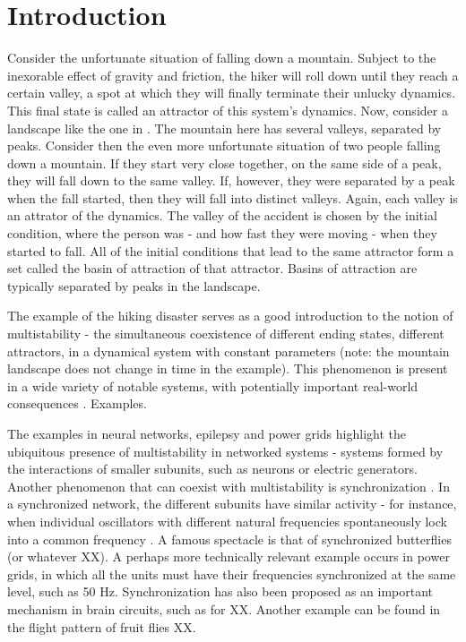 \chapter{Introduction}
Consider the unfortunate situation of falling down a mountain. Subject to the inexorable effect of gravity and friction, the hiker will roll down until they reach a certain valley, a spot at which they will finally terminate their unlucky dynamics. This final state is called an attractor of this system's dynamics. Now, consider a landscape like the one in . The mountain here has several valleys, separated by peaks. Consider then the even more unfortunate situation of two people falling down a mountain. If they start very close together, on the same side of a peak, they will fall down to the same valley. If, however, they were separated by a peak when the fall started, then they will fall into distinct valleys. Again, each valley is an attrator of the dynamics. The valley of the accident is chosen by the initial condition, where the person was - and how fast they were moving - when they started to fall. All of the initial conditions that lead to the same attractor form a set called the basin of attraction of that attractor. Basins of attraction are typically separated by peaks in the landscape.
%
\begin{figure}
    \centering
    \label{Landscape with valleys and peaks constitutes an example of multistability for an unfortunate falling person.}
\end{figure}


The example of the hiking disaster serves as a good introduction to the notion of multistability - the simultaneous coexistence of different ending states, different attractors, in a dynamical system with constant parameters (note: the mountain landscape does not change in time in the example). This phenomenon is present in a wide variety of notable systems, with potentially important real-world consequences \cite{}. Examples.

The examples in neural networks, epilepsy and power grids highlight the ubiquitous presence of multistability in networked systems - systems formed by the interactions of smaller subunits, such as neurons or electric generators.  Another phenomenon that can coexist with multistability is synchronization \cite{}. In a synchronized network, the different subunits have similar activity - for instance, when individual oscillators with different natural frequencies spontaneously lock into a common frequency \cite{strogtaz2000from}. A famous spectacle is that of synchronized butterflies (or whatever XX). A perhaps more technically relevant example occurs in power grids, in which all the units must have their frequencies synchronized at the same level, such as 50 Hz. Synchronization has also been proposed as an important mechanism in brain circuits, such as for XX. Another example can be found in the flight pattern of fruit flies XX. 

